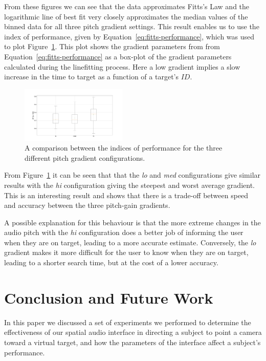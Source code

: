 \documentclass[format=sigconf, review=true, screen=true, anonymous=true]{acmart}
\begin{document}
From these figures we can see that the data approximates Fitts's Law and the logarithmic line of best fit very closely approximates the median values of the binned data for all three pitch gradient settings. This result enables us to use the index of performance, given by Equation~\ref{eq:fitts-performance}, which was used to plot Figure~\ref{fig:fitts-performance}. This plot shows the gradient parameters from from Equation~\ref{eq:fitts-performance} as a box-plot of the gradient parameters calculated during the linefitting process. Here a low gradient implies a slow increase in the time to target as a function of a target's $ID$. 

\begin{figure}
  \centering
  \includegraphics[width=0.45\textwidth]{figures/fitts_performance.png}
  \caption{A comparison between the indices of performance for the three different pitch gradient configurations.}
  \label{fig:fitts-performance}
\end{figure}

From Figure~\ref{fig:fitts-performance} it can be seen that that the \emph{lo} and \emph{med} configurations give similar results with the \emph{hi} configuration giving the steepest and worst average gradient. This is an interesting result and shows that there is a trade-off between speed and accuracy between the three pitch-gain gradients. 

A possible explanation for this behaviour is that the more extreme changes in the audio pitch with the \emph{hi} configuration does a better job of informing the user when they are on target, leading to a more accurate estimate. Conversely, the \emph{lo} gradient makes it more difficult for the user to know when they are on target, leading to a shorter search time, but at the cost of a lower accuracy. 

\section{Conclusion and Future Work}
\label{sec:conclusion}

In this paper we discussed a set of experiments we performed to determine the effectiveness of our spatial audio interface in directing a subject to point a camera toward a virtual target, and how the parameters of the interface affect a subject's performance. 
\end{document}
